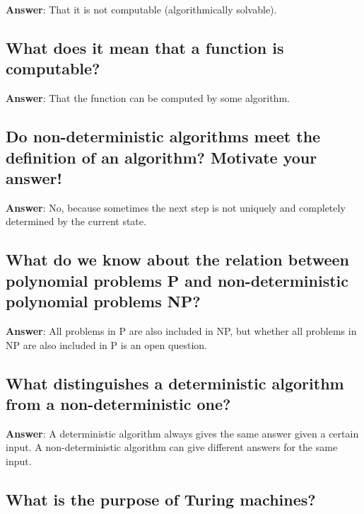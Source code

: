 \documentclass[a4paper,11pt,oneside]{article}
\begin{document}
\begin{sloppypar}
\label{q:340:sa:en:True}

\textbf{Answer}: That it is not computable (algorithmically solvable).



\subsection{What does it mean that a function is computable?}

\label{q:341:sa:en:True}

\textbf{Answer}: That the function can be computed by some algorithm.



\subsection{Do non-deterministic algorithms meet the definition of an algorithm? Motivate your answer!}

\label{q:342:sa:en:True}

\textbf{Answer}: No, because sometimes the next step is not uniquely and completely determined by the current state.



\subsection{What do we know about the relation between polynomial problems P and non-deterministic polynomial problems NP?}

\label{q:343:sa:en:True}

\textbf{Answer}: All problems in P are also included in NP, but whether all problems in NP are also included in P is an open question.



\subsection{What distinguishes a deterministic algorithm from a non-deterministic one?}

\label{q:344:sa:en:True}

\textbf{Answer}: A deterministic algorithm always gives the same answer given a certain input. A non-deterministic algorithm can give different answers for the same input.



\subsection{What is the purpose of Turing machines?}


\end{sloppypar}
\end{document}
